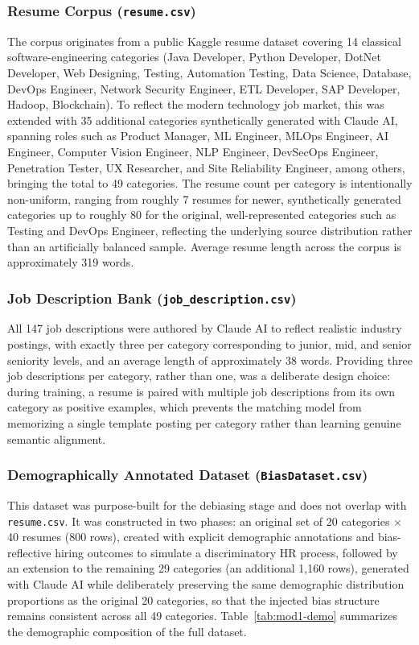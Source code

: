\documentclass[11pt,a4paper]{article}
\newcommand{\code}[1]{\texttt{\footnotesize #1}}
\begin{document}
\subsubsection{Resume Corpus (\code{resume.csv})}

The corpus originates from a public Kaggle resume dataset covering 14 classical software-engineering categories (Java Developer, Python Developer, DotNet Developer, Web Designing, Testing, Automation Testing, Data Science, Database, DevOps Engineer, Network Security Engineer, ETL Developer, SAP Developer, Hadoop, Blockchain). To reflect the modern technology job market, this was extended with 35 additional categories synthetically generated with Claude AI, spanning roles such as Product Manager, ML Engineer, MLOps Engineer, AI Engineer, Computer Vision Engineer, NLP Engineer, DevSecOps Engineer, Penetration Tester, UX Researcher, and Site Reliability Engineer, among others, bringing the total to 49 categories. The resume count per category is intentionally non-uniform, ranging from roughly 7 resumes for newer, synthetically generated categories up to roughly 80 for the original, well-represented categories such as Testing and DevOps Engineer, reflecting the underlying source distribution rather than an artificially balanced sample. Average resume length across the corpus is approximately 319 words.

\subsubsection{Job Description Bank (\code{job\_description.csv})}

All 147 job descriptions were authored by Claude AI to reflect realistic industry postings, with exactly three per category corresponding to junior, mid, and senior seniority levels, and an average length of approximately 38 words. Providing three job descriptions per category, rather than one, was a deliberate design choice: during training, a resume is paired with multiple job descriptions from its own category as positive examples, which prevents the matching model from memorizing a single template posting per category rather than learning genuine semantic alignment.

\subsubsection{Demographically Annotated Dataset (\code{BiasDataset.csv})}

This dataset was purpose-built for the debiasing stage and does not overlap with \code{resume.csv}. It was constructed in two phases: an original set of 20 categories $\times$ 40 resumes (800 rows), created with explicit demographic annotations and bias-reflective hiring outcomes to simulate a discriminatory HR process, followed by an extension to the remaining 29 categories (an additional 1{,}160 rows), generated with Claude AI while deliberately preserving the same demographic distribution proportions as the original 20 categories, so that the injected bias structure remains consistent across all 49 categories. Table~\ref{tab:mod1-demo} summarizes the demographic composition of the full dataset.
\end{document}
